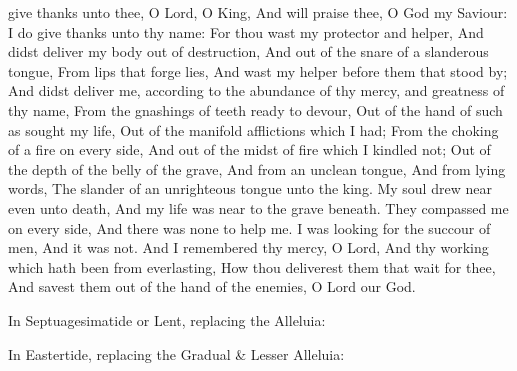  give thanks unto thee, O Lord, O King, And will praise thee, O God my Saviour: I do give thanks unto thy name: For thou wast my protector and helper, And didst deliver my body out of destruction, And out of the snare of a slanderous tongue, From lips that forge lies, And wast my helper before them that stood by; And didst deliver me, according to the abundance of thy mercy, and greatness of thy name, From the gnashings of teeth ready to devour, Out of the hand of such as sought my life, Out of the manifold afflictions which I had; From the choking of a fire on every side, And out of the midst of fire which I kindled not; Out of the depth of the belly of the grave, And from an unclean tongue, And from lying words, The slander of an unrighteous tongue unto the king. My soul drew near even unto death, And my life was near to the grave beneath. They compassed me on every side, And there was none to help me. I was looking for the succour of men, And it was not. And I remembered thy mercy, O Lord, And thy working which hath been from everlasting, How thou deliverest them that wait for thee, And savest them out of the hand of the enemies, O Lord our God.


\begin{rubric}
{In Septuagesimatide or Lent, replacing the Alleluia:}
\end{rubric}

\vspace{-1ex}


\begin{rubric}
{In Eastertide, replacing the Gradual \& Lesser Alleluia:}
\end{rubric}

\vspace{-1ex}


